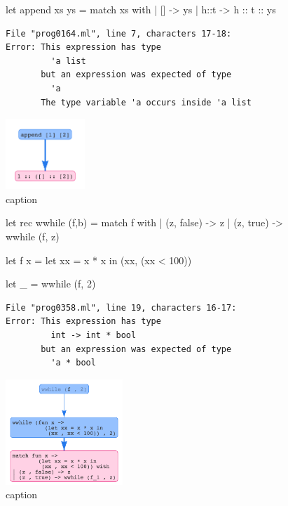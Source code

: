 \begin{figure}[ht]
\centering
\begin{minipage}{0.49\linewidth}
\centering
\begin{code}
let append xs ys = match xs with
  | []   -> ys
  | h::t -> h :: t :: ys
\end{code}
\begin{verbatim}
File "prog0164.ml", line 7, characters 17-18:
Error: This expression has type
         'a list
       but an expression was expected of type
         'a
       The type variable 'a occurs inside 'a list
\end{verbatim}
\end{minipage}
\begin{minipage}{0.49\linewidth}
\centering
\includegraphics[height=100px]{append.png}
\end{minipage}
\caption{caption}
\label{fig:traces}
\end{figure}

\begin{figure}[ht]
\centering
\begin{minipage}{0.49\linewidth}
\centering
\begin{code}
let rec wwhile (f,b) =
  match f with
  | (z, false) -> z
  | (z, true)  -> wwhile (f, z)

let f x =
  let xx = x * x in
  (xx, (xx < 100))

let _ = wwhile (f, 2)
\end{code}
\begin{verbatim}
File "prog0358.ml", line 19, characters 16-17:
Error: This expression has type
         int -> int * bool
       but an expression was expected of type
         'a * bool
\end{verbatim}
\end{minipage}
\begin{minipage}{0.49\linewidth}
\centering
\includegraphics[height=150px]{wwhile.png}
\end{minipage}
\caption{caption}
\label{fig:traces}
\end{figure}














